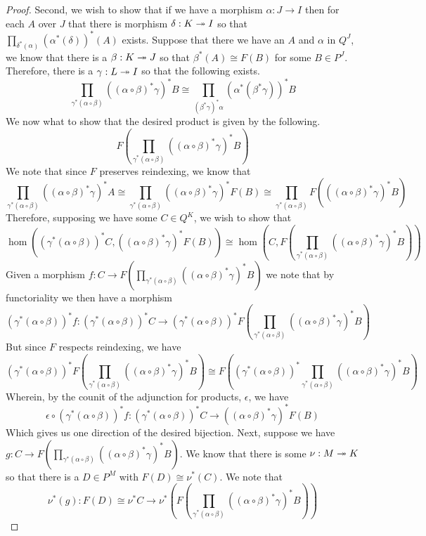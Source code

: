 \begin{proof}
  Second, we wish to show that if we have a morphism
  $\alpha : J \to I$ then for each $A$ over $J$ that there is morphism
  $\delta : K \twoheadrightarrow I$ so that $\prod_{\delta^*(\alpha)} (\alpha^*(\delta))^*(A)$
  exists. Suppose that there we have an $A$ and $\alpha$ in $Q^J$, we
  know that there is a $\beta : K \twoheadrightarrow J$ so that
  $\beta^*(A) \cong F(B)$ for some $B \in P^J$. Therefore, there is a
  $\gamma : L \twoheadrightarrow I$ so that the following exists.
  \[
    \prod_{\gamma^*(\alpha \circ \beta)} ((\alpha \circ \beta)^*\gamma)^* B \cong
    \prod_{(\beta^*\gamma)^*\alpha} (\alpha^*(\beta^*\gamma))^* B
  \]
  We now what to show that the desired product is given by the
  following.
  \[
    F(\prod_{\gamma^*(\alpha \circ \beta)} ((\alpha \circ \beta)^*\gamma)^* B)
  \]
  We note that since $F$ preserves reindexing, we know that
  \[
    \prod_{\gamma^*(\alpha \circ \beta)} ((\alpha \circ \beta)^*\gamma)^* A \cong
    \prod_{\gamma^*(\alpha \circ \beta)} ((\alpha \circ \beta)^*\gamma)^* F(B) \cong
    \prod_{\gamma^*(\alpha \circ \beta)} F(((\alpha \circ \beta)^*\gamma)^* B)
  \]
  Therefore, supposing we have some $C \in Q^K$, we wish to show that
  \[
    \hom((\gamma^*(\alpha \circ \beta))^* C, ((\alpha \circ \beta)^*\gamma)^* F(B)) \cong
    \hom(C, F(\prod_{\gamma^*(\alpha \circ \beta)} ((\alpha \circ \beta)^*\gamma)^* B))
  \]
  Given a morphism $f : C \to F(\prod_{\gamma^*(\alpha \circ \beta)} ((\alpha \circ \beta)^*\gamma)^* B)$
  we note that by functoriality we then have a morphism
  \[
    (\gamma^*(\alpha \circ \beta))^*f :
    (\gamma^*(\alpha \circ \beta))^*C \to
    (\gamma^*(\alpha \circ \beta))^*F(\prod_{\gamma^*(\alpha \circ \beta)} ((\alpha \circ \beta)^*\gamma)^* B)
  \]
  But since $F$ respects reindexing, we have
  \[
    (\gamma^*(\alpha \circ \beta))^*F(\prod_{\gamma^*(\alpha \circ \beta)} ((\alpha \circ \beta)^*\gamma)^* B) \cong
    F((\gamma^*(\alpha \circ \beta))^*\prod_{\gamma^*(\alpha \circ \beta)} ((\alpha \circ \beta)^*\gamma)^* B)
  \]
  Wherein, by the counit of the adjunction for products, $\epsilon$, we have
  \[
    \epsilon \circ (\gamma^*(\alpha \circ \beta))^*f :
    (\gamma^*(\alpha \circ \beta))^*C \to ((\alpha \circ \beta)^*\gamma)^* F(B)
  \]
  Which gives us one direction of the desired bijection. Next, suppose
  we have $g : C \to F(\prod_{\gamma^*(\alpha \circ \beta)} ((\alpha \circ \beta)^*\gamma)^* B)$.
  We know that there is some $\nu : M \twoheadrightarrow K$ so that there is a
  $D \in P^M$ with $F(D) \cong \nu^*(C)$. We note that
  \[
    \nu^*(g) : F(D) \cong \nu^*C \to \nu^*(F(\prod_{\gamma^*(\alpha \circ \beta)} ((\alpha \circ \beta)^*\gamma)^* B))
\]
\end{proof}

